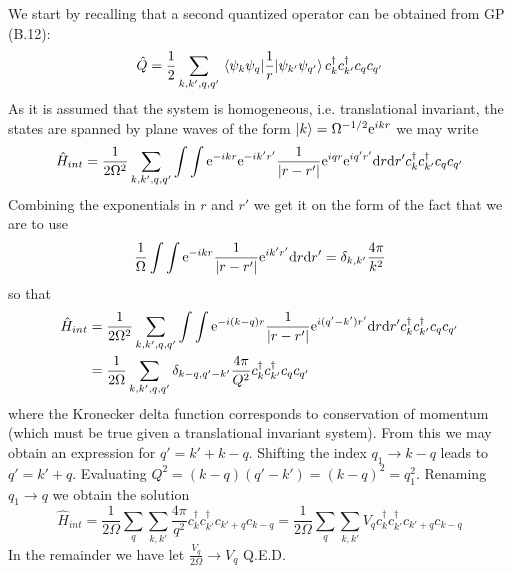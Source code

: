 \begin{solution}
We start by recalling that a second quantized operator can be obtained from GP (B.12):
\begin{equation}
    \hat{Q} = \dfrac{1}{2}\sum_{k,k',q,q'} \mel{\psi_k\psi_q}{\dfrac{1}{r}}{\psi_{k'} \psi_{q'}}c^{\dagger}_{k}c^{\dagger}_{k'}c_{q}c_{q'}
\end{equation}
As it is assumed that the system is homogeneous, i.e. translational invariant, the states are spanned by plane waves of the form $|k\rangle = \Omega^{-1/2}\mathrm{e}^{ikr}$ we may write
\begin{equation}
    \hat{H}_{int} = \dfrac{1}{2\Omega^2}\sum_{k,k',q,q'}\int\int\mathrm{e}^{-ikr}\mathrm{e}^{-ik'r'}\dfrac{1}{\abs{r-r'}}\mathrm{e}^{iqr}\mathrm{e}^{iq'r'}\mathrm{d}r\mathrm{d}r'c^{\dagger}_{k}c^{\dagger}_{k'}c_{q}c_{q'}
\end{equation}
Combining the exponentials in $r$ and $r'$ we get it on the form of the fact that we are to use
\begin{equation}
   \frac{1}{\Omega} \int\int\mathrm{e}^{-ikr}\dfrac{1}{\abs{r-r'}}\mathrm{e}^{ik'r'}\mathrm{d}r\mathrm{d}r' = \delta_{k,k'}\dfrac{4\pi}{k^2}
\end{equation}
so that
\begin{equation}
\begin{split}
    \hat{H}_{int} &= \dfrac{1}{2\Omega^2}\sum_{k,k',q,q'} \int\int\mathrm{e}^{-i(k-q)r}\dfrac{1}{\abs{r-r'}}\mathrm{e}^{i(q'-k')r'}\mathrm{d}r\mathrm{d}r'c^{\dagger}_{k}c^{\dagger}_{k'}c_{q}c_{q'} \\
    &= \dfrac{1}{2\Omega}\sum_{k,k',q,q'}\delta_{k-q,q'-k'}\dfrac{4\pi}{Q^2}c^{\dagger}_{k}c^{\dagger}_{k'}c_{q}c_{q'}
\end{split}
\end{equation}
where the Kronecker delta function corresponds to conservation of momentum (which must be true given a translational invariant system). From this we may obtain an expression for $q' = k'+k-q$. Shifting the index $q_1 \rightarrow k-q$ leads to $q' = k' + q$. Evaluating $Q^2 = (k-q)(q'-k') = (k-q)^2 = q_1^2$. Renaming $q_1 \rightarrow q$ we obtain the solution
\begin{equation}
    \hat{H}_{int} = \dfrac{1}{2\Omega}\sum_{q}\sum_{k,k'}\dfrac{4\pi}{q^2}c^{\dagger}_{k}c^{\dagger}_{k'}c_{k'+q}c_{k-q} = \dfrac{1}{2\Omega}\sum_{q}\sum_{k,k'}V_q c^{\dagger}_{k}c^{\dagger}_{k'}c_{k'+q}c_{k-q}
\end{equation}
In the remainder we have let $\frac{V_q}{2 \Omega}\rightarrow V_q$
Q.E.D.
\end{solution}

